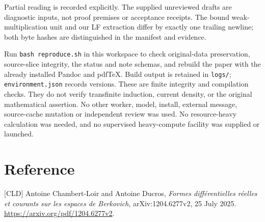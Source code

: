 \documentclass[
  11pt,
]{article}
\begin{document}
Partial reading is recorded explicitly. The supplied unreviewed drafts
are diagnostic inputs, not proof premises or acceptance receipts. The
bound weak-multiplication unit and our LF extraction differ by exactly
one trailing newline; both byte hashes are distinguished in the manifest
and evidence.

Run \texttt{bash\ reproduce.sh} in this workspace to check original-data
preservation, source-slice integrity, the status and note schemas, and
rebuild the paper with the already installed Pandoc and pdfTeX. Build
output is retained in \texttt{logs/}; \texttt{environment.json} records
versions. These are finite integrity and compilation checks. They do not
verify transfinite induction, current density, or the original
mathematical assertion. No other worker, model, install, external
message, source-cache mutation or independent review was used. No
resource-heavy calculation was needed, and no supervised heavy-compute
facility was supplied or launched.

\section{Reference}\label{reference}

{[}CLD{]} Antoine Chambert-Loir and Antoine Ducros, \emph{Formes
différentielles réelles et courants sur les espaces de Berkovich},
arXiv:1204.6277v2, 25 July 2025.
\url{https://arxiv.org/pdf/1204.6277v2}.
\end{document}
